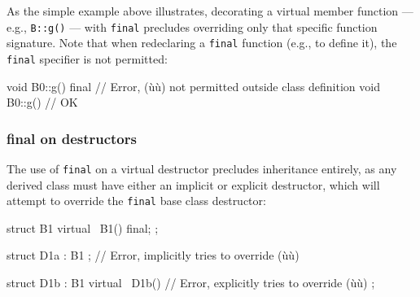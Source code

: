 \noindent As the simple example above illustrates, decorating a virtual member
function --- e.g., \lstinline!B::g()! --- with \lstinline!final! precludes
overriding only that specific function signature. Note that when
redeclaring a \lstinline!final! function (e.g., to define it), the
\lstinline!final! specifier is not permitted:

\begin{emcppslisting}[emcppsbatch=e1]
void B0::g() final { }  // Error, (ù{}ù) not permitted outside class definition
void B0::g() { }        // OK
\end{emcppslisting}
    

\subsubsection[\lstinline!final! on destructors]{{\SubsubsecCode final} on destructors}\label{final-on-destructors}

The use of \lstinline!final! on a virtual destructor precludes inheritance
entirely, as any derived class must have either an implicit or explicit
destructor, which will attempt to override the \lstinline!final! base class
destructor:

\begin{emcppslisting}[emcppsbatch=e1,emcppserrorlines={8,9,11}]
struct B1
{
    virtual ~B1() final;
};

struct D1a : B1 { };    // Error, implicitly tries to override (ù{}ù)

struct D1b : B1
{
    virtual ~D1b() { }  // Error, explicitly tries to override (ù{}ù)
};
\end{emcppslisting}
    

